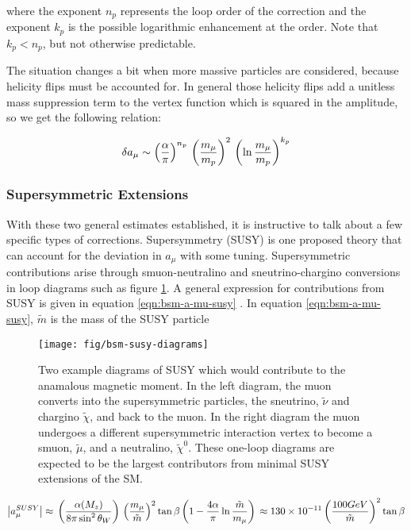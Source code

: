 \noindent
where the exponent $n_p$ represents the loop order of the correction and the exponent $k_p$ is the possible logarithmic enhancement at the order.  Note that $k_p < n_p$, but not otherwise predictable.

The situation changes a bit when more massive particles are considered, because helicity flips must be accounted for.  In general those helicity flips add a unitless mass suppression term to the vertex function which is squared in the amplitude, so we get the following relation:

\begin{equation}
\label{eqn:bsm-general-large-m}
\delta a_\mu \sim \left(\frac{\alpha}{\pi}\right)^{n_p} \\
\left(\frac{m_\mu}{m_p}\right)^2 \\
\left(\ln{\frac{m_\mu}{m_p}} \right)^{k_p}
\end{equation}

\subsubsection{Supersymmetric Extensions}
With these two general estimates established, it is instructive to talk about a few specific types of corrections.  Supersymmetry (SUSY) is one proposed theory that can account for the deviation in $a_\mu$ with some tuning.  Supersymmetric contributions arise through smuon-neutralino and sneutrino-chargino conversions in loop diagrams such as figure \ref{fig:bsm-susy-diagrams}.  A general expression for contributions from SUSY is given in equation \ref{eqn:bsm-a-mu-susy} \cite{a-mu-harbinger}.  In equation \ref{eqn:bsm-a-mu-susy}, $\tilde{m}$ is the mass of the SUSY particle

\begin{figure}
\centering
\texttt{[image: fig/bsm-susy-diagrams]}
\caption{Two example diagrams of SUSY which would contribute to the anamalous magnetic moment. In the left diagram, the muon converts into the supersymmetric particles, the sneutrino, $\tilde{\nu}$ and chargino $\tilde{\chi}$, and back to the muon.  In the right diagram the muon undergoes a different supersymmetric interaction vertex to become a smuon, $\tilde{\mu}$, and a neutralino, $\tilde{\chi}^0$.  These one-loop diagrams are expected to be the largest contributors from minimal SUSY extensions of the SM. \label{fig:bsm-susy-diagrams}}
\end{figure}

\begin{equation}
\label{eqn:bsm-a-mu-susy}
\left|a_\mu^{SUSY}\right| \approx \\
\left(\frac{\alpha(M_z)}{8 \pi \sin^2{\theta_W}} \right) \\
\left( \frac{m_\mu}{\tilde{m}} \right)^2 \tan{\beta} \\
\left(1 - \frac{4\alpha}{\pi}\ln{\frac{\tilde{m}}{m_\mu}} \right) \\
\approx 130 \times 10^{-11} \\
\left(\frac{100 GeV}{\tilde{m}} \right)^2 \tan{\beta}
\end{equation}

